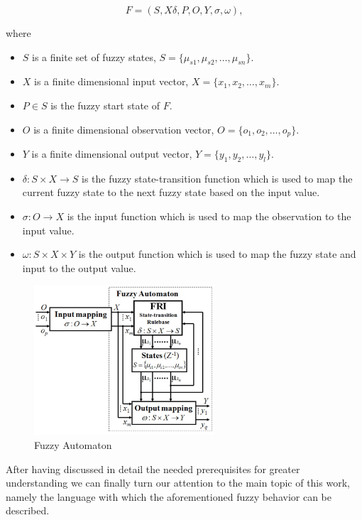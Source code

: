\[
	F = (S, X \delta, P, O, Y, \sigma, \omega),
\]

\noindent where

\begin{itemize}
	\item $S$ is a finite set of fuzzy states, $S = \{\mu_{s1}, \mu_{s2}, \ldots, \mu_{sn}\}$.
	\item $X$ is a finite dimensional input vector, $X = \{x_1, x_2, \ldots, x_m\}$.
	\item $P \in S$ is the fuzzy start state of $F$.
	\item  $O$ is a finite dimensional observation vector, $O = \{o_1, o_2, \ldots, o_p\}$.
	\item $Y$ is a finite dimensional output vector, $Y = \{y_1, y_2, \ldots, y_l\}$.
	\item $\delta : S \times X \rightarrow S$ is the fuzzy state-transition function which is used to map the current fuzzy state to the next fuzzy state based on the input value.
	\item $\sigma : O \rightarrow X$ is the input function which is used to map the observation to the input value.
	\item $\omega : S \times X \times Y$ is the output function which is used to map the fuzzy state and input to the output value.
\end{itemize}

\begin{figure}[!h]
	\centering
	\includegraphics[width=0.6\textwidth]{images/fuzzy_automaton}
	\caption{Fuzzy Automaton}
	\label{fig:automaton}
\end{figure}

After having discussed in detail the needed prerequisites for greater understanding we can finally turn our attention to the main topic of this work, namely the language with which the aforementioned fuzzy behavior can be described. 


